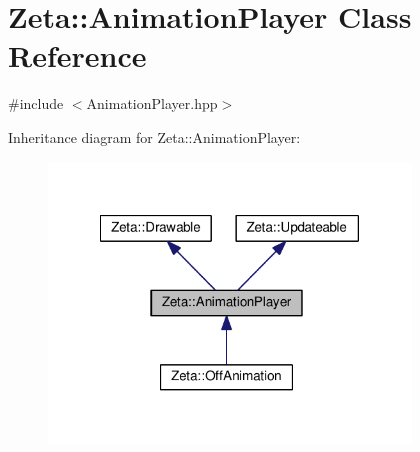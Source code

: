 \hypertarget{classZeta_1_1AnimationPlayer}{\section{Zeta\+:\+:Animation\+Player Class Reference}
\label{classZeta_1_1AnimationPlayer}
}


{\ttfamily \#include $<$Animation\+Player.\+hpp$>$}



Inheritance diagram for Zeta\+:\+:Animation\+Player\+:\nopagebreak
\begin{figure}[H]
\begin{center}
\leavevmode
\includegraphics[width=273pt]{classZeta_1_1AnimationPlayer__inherit__graph}
\end{center}
\end{figure}


